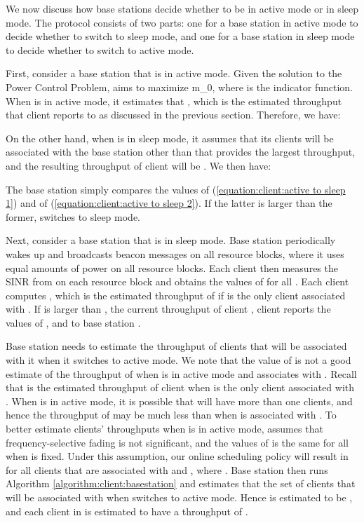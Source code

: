 \documentclass[conference]{IEEEtran}
\begin{document}
We now discuss how base stations decide whether to be in active mode or in sleep mode. The protocol consists of two parts: one for a base station in active mode to decide whether to switch to sleep mode, and one for a base station in sleep mode to decide whether to switch to active mode.

First, consider a base station  that is in active mode. Given the solution to the Power Control Problem,  aims to maximize m_0, where  is the indicator function. When  is in active mode, it estimates that , which is the estimated throughput that client  reports to  as discussed in the previous section. Therefore, we have:

On the other hand, when  is in sleep mode, it assumes that its clients will be associated with the base station other than  that provides the largest throughput, and the resulting throughput of client  will be . We then have:

The base station  simply compares the values of (\ref{equation:client:active to sleep 1}) and of (\ref{equation:client:active to sleep 2}). If the latter is larger than the former,  switches to sleep mode. 

Next, consider a base station  that is in sleep mode. Base station  periodically wakes up and broadcasts beacon messages on all resource blocks, where it uses equal amounts of power on all resource blocks. Each client  then measures the SINR from  on each resource block and obtains the values of  for all . Each client  computes , which is the estimated throughput of  if  is the only client associated with . If  is larger than , the current throughput of client , client  reports the values of , and  to base station .

Base station  needs to estimate the throughput of clients that will be associated with it when it switches to active mode. We note that the value of  is not a good estimate of the throughput of  when  is in active mode and  associates with . Recall that  is the estimated throughput of client  when  is the only client associated with . When  is in active mode, it is possible that  will have more than one clients, and hence the throughput of  may be much less than  when  is associated with . To better estimate clients' throughputs when  is in active mode,  assumes that frequency-selective fading is not significant, and the values of  is the same for all  when  is fixed. Under this assumption, our online scheduling policy will result in  for all clients that are associated with  and , where . Base station  then runs Algorithm \ref{algorithm:client:basestation} and estimates that the set  of clients that will be associated with  when  switches to active mode. Hence  is estimated to be , and each client  in  is estimated to have a throughput of .
\end{document}
